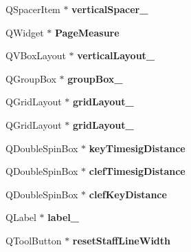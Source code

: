 \begin{DoxyCompactItemize}
Q\+Spacer\+Item $\ast$ {\bfseries vertical\+Spacer\+\_}
\item 
\mbox{\label{class_ui___edit_style_base_a61f5cbae0384ec065bbb8902da985e14}} 
Q\+Widget $\ast$ {\bfseries Page\+Measure}
\item 
\mbox{\label{class_ui___edit_style_base_aab6973b96c0f78a0ec010979ab883f05}} 
Q\+V\+Box\+Layout $\ast$ {\bfseries vertical\+Layout\+\_}
\item 
\mbox{\label{class_ui___edit_style_base_aceb9d0f5a37a4c72f7ee70be0f167758}} 
Q\+Group\+Box $\ast$ {\bfseries group\+Box\+\_}
\item 
\mbox{\label{class_ui___edit_style_base_aaf9a4f768d4ded1a6c3626a38fafd9b6}} 
Q\+Grid\+Layout $\ast$ {\bfseries grid\+Layout\+\_}
\item 
\mbox{\label{class_ui___edit_style_base_a7eec038d71e6df5ad69650564f4ea42e}} 
Q\+Grid\+Layout $\ast$ {\bfseries grid\+Layout\+\_}
\item 
\mbox{\label{class_ui___edit_style_base_a9c1b7298c9f081eff85e2776e1ca52d4}} 
Q\+Double\+Spin\+Box $\ast$ {\bfseries key\+Timesig\+Distance}
\item 
\mbox{\label{class_ui___edit_style_base_a3e8ef0c3ed4e3791caf9ae67e0737254}} 
Q\+Double\+Spin\+Box $\ast$ {\bfseries clef\+Timesig\+Distance}
\item 
\mbox{\label{class_ui___edit_style_base_a7b8c3078d838cbf5ec9bf0a45e86dfaf}} 
Q\+Double\+Spin\+Box $\ast$ {\bfseries clef\+Key\+Distance}
\item 
\mbox{\label{class_ui___edit_style_base_a7557febb9fa6dd16d7771b0c08c28b3f}} 
Q\+Label $\ast$ {\bfseries label\+\_}
\item 
\mbox{\label{class_ui___edit_style_base_a1fc1f56105752187f842dc14c841094b}} 
Q\+Tool\+Button $\ast$ {\bfseries reset\+Staff\+Line\+Width}
\item 

\end{DoxyCompactItemize}
